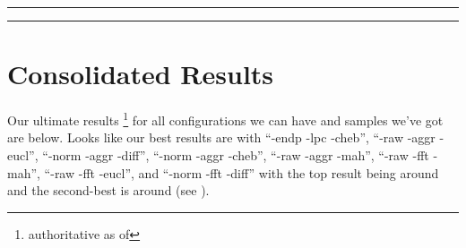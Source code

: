 \vspace{15pt}
\hrule
\scriptsize

\normalsize
\hrule
\vspace{15pt}

\clearpage


\section{Consolidated Results}

Our ultimate results \footnote{authoritative as of } for all configurations we can have
and samples we've got are below.
Looks like our best results are with
``-endp -lpc -cheb'',
``-raw -aggr -eucl'',
``-norm -aggr -diff'',
``-norm -aggr -cheb'',
``-raw -aggr -mah'',
``-raw -fft -mah'',
``-raw -fft -eucl'', and
``-norm -fft -diff''
with the top result being around \bestscore{} and the second-best is
around \bestscore{} (see ).




